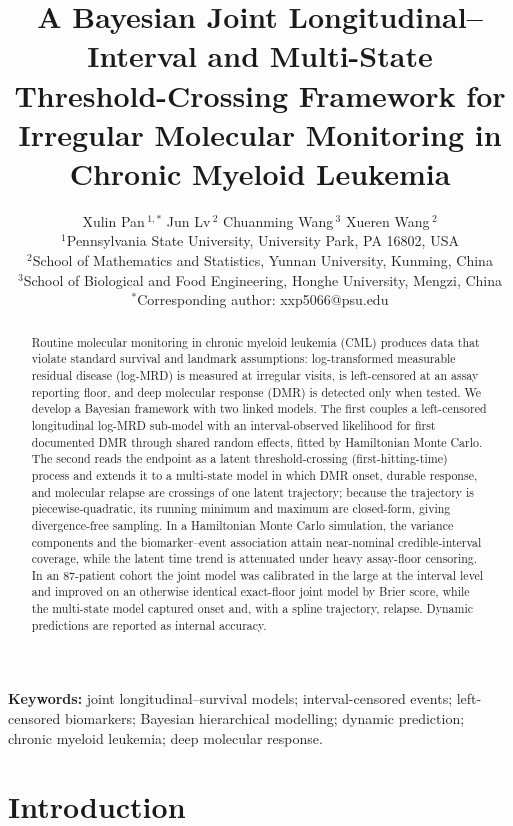 \documentclass[11pt]{article}
\title{A Bayesian Joint Longitudinal--Interval and Multi-State
Threshold-Crossing Framework for Irregular Molecular Monitoring in Chronic
Myeloid Leukemia}
\author{
  Xulin Pan\,$^{1,\ast}$ \quad Jun Lv\,$^{2}$ \quad Chuanming Wang\,$^{3}$ \quad
  Xueren Wang\,$^{2}$ \\[6pt]
  \small $^{1}$Pennsylvania State University, University Park, PA 16802, USA\\
  \small $^{2}$School of Mathematics and Statistics, Yunnan University, Kunming, China\\
  \small $^{3}$School of Biological and Food Engineering, Honghe University, Mengzi, China\\
  \small $^{\ast}$Corresponding author: xxp5066@psu.edu
}
\date{}
\begin{document}
\maketitle

\begin{abstract}
Routine molecular monitoring in chronic myeloid leukemia (CML) produces data
that violate standard survival and landmark assumptions: log-transformed
measurable residual disease (log-MRD) is measured at irregular visits, is
left-censored at an assay reporting floor, and deep molecular response (DMR) is
detected only when tested. We develop a Bayesian framework with
two linked models. The first couples a left-censored longitudinal log-MRD sub-model with an
interval-observed likelihood for first documented DMR through shared random
effects, fitted by Hamiltonian Monte Carlo. The second reads the
endpoint as a latent threshold-crossing (first-hitting-time) process and
extends it to a multi-state model in which DMR onset, durable response, and
molecular relapse are crossings of one latent trajectory; because
the trajectory is piecewise-quadratic, its running minimum and maximum are
closed-form, giving divergence-free sampling. In a Hamiltonian Monte Carlo simulation, the variance components and the
biomarker--event association attain near-nominal credible-interval coverage,
while the latent time trend is attenuated under heavy assay-floor censoring. In an 87-patient cohort the joint model was
calibrated in the large at the interval level and improved on an otherwise
identical exact-floor joint model by Brier score,
while the multi-state model captured onset and, with a spline trajectory,
relapse. Dynamic predictions are reported as internal accuracy.
\end{abstract}

\noindent\textbf{Keywords:} joint longitudinal--survival models;
interval-censored events; left-censored biomarkers; Bayesian hierarchical
modelling; dynamic prediction; chronic myeloid leukemia; deep molecular
response.

\section{Introduction}
\end{document}
